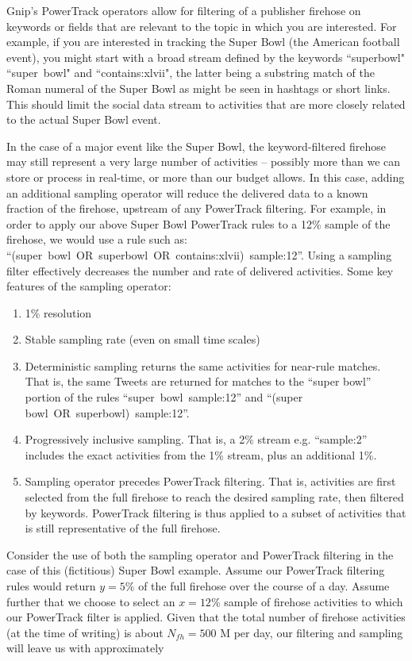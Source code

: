 \documentclass{article}
\begin{document}
Gnip's PowerTrack operators allow for filtering of a publisher firehose on keywords or fields that are 
relevant to the topic in which you are interested. For example, if you are interested in tracking the 
Super Bowl (the American football event), you might start with a broad stream defined by the 
keywords ``superbowl" ``super~bowl" 
and ``contains:xlvii", the latter being a substring match of the Roman numeral of the Super Bowl as 
might be seen in hashtags or short links. This should limit the social data stream to activities that are 
more closely related to the actual Super Bowl event. 

In the case of a major event like the Super Bowl, the keyword-filtered firehose may still represent a 
very large number of activities -- possibly more than we can store or process in real-time, or more than 
our budget allows. In this case, adding an additional sampling operator will reduce the delivered data 
to a known fraction of the firehose, upstream of any PowerTrack filtering. 
For example, in order to apply our above Super 
Bowl PowerTrack rules to a 12\% sample of the firehose, we would use a rule such as: 
``(super~bowl~OR~superbowl~OR~contains:xlvii)~sample:12''. Using a sampling filter effectively decreases 
the number and rate of delivered activities. Some key features of the sampling operator:

\begin{enumerate}
	\item 1\% resolution
	\item Stable sampling rate (even on small time scales)
	\item Deterministic sampling returns the same activities for near-rule matches.  That is, the same 
Tweets are returned for matches to the ``super bowl'' portion of the rules ``super~bowl~sample:12'' and 
``(super bowl~OR~superbowl)~sample:12''.
	\item Progressively inclusive sampling. That is, a 2\% stream e.g. ``sample:2'' includes the exact 
activities from	the 1\% stream, plus an additional 1\%.
	\item Sampling operator precedes PowerTrack filtering. That is, activities are first selected 
from the full firehose to reach the desired sampling rate, then filtered by keywords. 
PowerTrack filtering is thus applied to a subset of activities that is still representative 
of the full firehose.
\end{enumerate}


Consider the use of both the sampling operator and PowerTrack filtering in the case of this (fictitious) 
Super Bowl example. Assume our PowerTrack filtering rules would return $y=5\%$ of the full firehose over the 
course of a day. Assume further that we choose to select an $x=12\%$ sample of firehose activities 
to which our PowerTrack filter is applied. Given that the total number of firehose activities (at the time 
of writing) is about $N_{fh}=500$ M per day, our filtering and sampling will leave us with approximately
\end{document}
